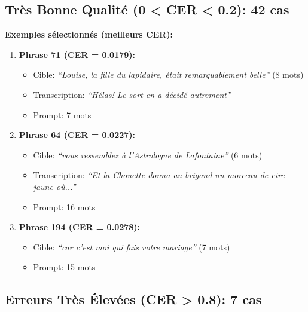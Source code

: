 \documentclass[12pt,a4paper]{article}
\begin{document}
\subsection{Très Bonne Qualité (0 < CER < 0.2): 42 cas}

\textbf{Exemples sélectionnés (meilleurs CER):}

\begin{enumerate}
    \item \textbf{Phrase 71 (CER = 0.0179):}
    \begin{itemize}
        \item Cible: \textit{``Louise, la fille du lapidaire, était remarquablement belle''} (8 mots)
        \item Transcription: \textit{``Hélas! Le sort en a décidé autrement''}
        \item Prompt: 7 mots
    \end{itemize}
    
    \item \textbf{Phrase 64 (CER = 0.0227):}
    \begin{itemize}
        \item Cible: \textit{``vous ressemblez à l'Astrologue de Lafontaine''} (6 mots)
        \item Transcription: \textit{``Et la Chouette donna au brigand un morceau de cire jaune où...''}
        \item Prompt: 16 mots
    \end{itemize}
    
    \item \textbf{Phrase 194 (CER = 0.0278):}
    \begin{itemize}
        \item Cible: \textit{``car c'est moi qui fais votre mariage''} (7 mots)
        \item Prompt: 15 mots
    \end{itemize}
\end{enumerate}

\subsection{Erreurs Très Élevées (CER > 0.8): 7 cas}
\end{document}
